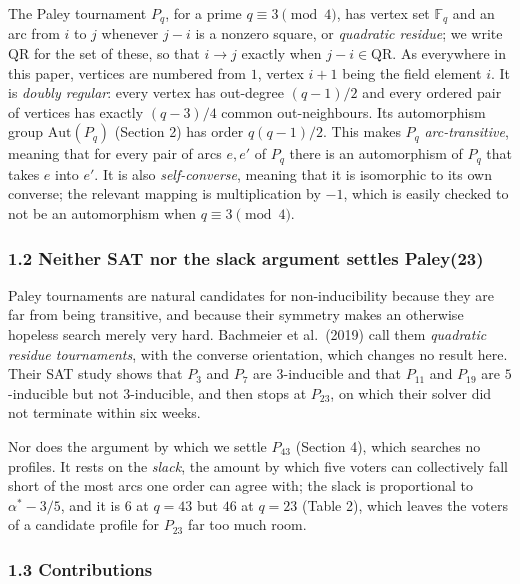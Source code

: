 \documentclass[
]{article}
\begin{document}
The Paley tournament \(P_q\), for a prime \(q \equiv 3 \pmod 4\), has
vertex set \(\mathbb{F}_q\) and an arc from \(i\) to \(j\) whenever
\(j - i\) is a nonzero square, or \emph{quadratic residue}; we write
\(\mathrm{QR}\) for the set of these, so that \(i \to j\) exactly when
\(j - i \in
\mathrm{QR}\). As everywhere in this paper, vertices are numbered from
\(1\), vertex \(i + 1\) being the field element \(i\). It is
\emph{doubly regular}: every vertex has out-degree \((q-1)/2\) and every
ordered pair of vertices has exactly \((q-3)/4\) common out-neighbours.
Its automorphism group \(\mathrm{Aut}(P_q)\) (Section 2) has order
\(q(q-1)/2\). This makes \(P_q\) \emph{arc-transitive}, meaning that for
every pair of arcs \(e, e'\) of \(P_q\) there is an automorphism of
\(P_q\) that takes \(e\) into \(e'\). It is also \emph{self-converse},
meaning that it is isomorphic to its own converse; the relevant mapping
is multiplication by \(-1\), which is easily checked to not be an
automorphism when \(q \equiv 3 \pmod 4\).

\subsubsection{1.2 Neither SAT nor the slack argument settles
Paley(23)}\label{neither-sat-nor-the-slack-argument-settles-paley23}

Paley tournaments are natural candidates for non-inducibility because
they are far from being transitive, and because their symmetry makes an
otherwise hopeless search merely very hard. Bachmeier et al.~(2019) call
them \emph{quadratic residue tournaments}, with the converse
orientation, which changes no result here. Their SAT study shows that
\(P_3\) and \(P_7\) are \(3\)-inducible and that \(P_{11}\) and
\(P_{19}\) are \(5\)-inducible but not \(3\)-inducible, and then stops
at \(P_{23}\), on which their solver did not terminate within six weeks.

Nor does the argument by which we settle \(P_{43}\) (Section 4), which
searches no profiles. It rests on the \emph{slack}, the amount by which
five voters can collectively fall short of the most arcs one order can
agree with; the slack is proportional to \(\alpha^{*} - 3/5\), and it is
\(6\) at \(q = 43\) but \(46\) at \(q = 23\) (Table 2), which leaves the
voters of a candidate profile for \(P_{23}\) far too much room.

\subsubsection{1.3 Contributions}\label{contributions}
\end{document}

